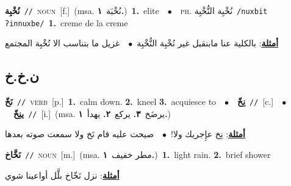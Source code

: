 \documentclass[10pt,a4paper,twoside]{article} %
\begin{document}
\begin{multicols}{2}
{\setlength\topsep{0pt}\textbf{\foreignlanguage{arabic}{نُخْبِة}}\ {\color{gray}\texttt{//}\color{black}}\ \textsc{noun}\ [f.]\ \color{gray}(msa. \foreignlanguage{arabic}{نُخْبَة}~\foreignlanguage{arabic}{\textbf{١.}})\color{black}\ \textbf{1.}~elite\ \ $\bullet$\ \ \textsc{ph.} \color{gray} \foreignlanguage{arabic}{نُخْبِة النُّخْبِة}\color{black}\ {\color{gray}\texttt{/{\sffamily nuxbit ʔinnuxbe}/}\color{black}}\ \textbf{1.}~creme de la creme\  \begin{flushright}\color{gray}\foreignlanguage{arabic}{\textbf{\underline{\foreignlanguage{arabic}{أمثلة}}}: بالكلية عنا مابنقبل غير نُخْبِة النُّخْبِة\ $\bullet$\ \  غزيل ما بتناسب الا نُخْبِة المجتمع}\end{flushright}\color{black}} \vspace{2mm}

\vspace{-3mm}
\subsection*{\color{blue}\foreignlanguage{arabic}{ن.خ.خ}\color{blue}{}} 

{\setlength\topsep{0pt}\textbf{\foreignlanguage{arabic}{نَخّ}}\ {\color{gray}\texttt{//}\color{black}}\ \textsc{verb}\ [p.]\ \textbf{1.}~calm down.  \textbf{2.}~kneel  \textbf{3.}~acquiesce to\ \ $\bullet$\ \ \setlength\topsep{0pt}\textbf{\foreignlanguage{arabic}{نِخّ}}\ {\color{gray}\texttt{//}\color{black}}\ [c.]\ \ $\bullet$\ \ \setlength\topsep{0pt}\textbf{\foreignlanguage{arabic}{ينِخّ}}\ {\color{gray}\texttt{//}\color{black}}\ [i.]\ \color{gray}(msa. \foreignlanguage{arabic}{يرضَخ}~\foreignlanguage{arabic}{\textbf{٣.}}  \foreignlanguage{arabic}{يركع}~\foreignlanguage{arabic}{\textbf{٢.}}  \foreignlanguage{arabic}{يهدأ}~\foreignlanguage{arabic}{\textbf{١.}})\color{black}\  \begin{flushright}\color{gray}\foreignlanguage{arabic}{\textbf{\underline{\foreignlanguage{arabic}{أمثلة}}}: نِخ عإِجريك ولا!\ $\bullet$\ \  صيحت عليه قام نَخ ولا سمعت صوته بعدها}\end{flushright}\color{black}} \vspace{2mm}

{\setlength\topsep{0pt}\textbf{\foreignlanguage{arabic}{نَخَّاخ}}\ {\color{gray}\texttt{//}\color{black}}\ \textsc{noun}\ [m.]\ \color{gray}(msa. \foreignlanguage{arabic}{مطر خفيف}~\foreignlanguage{arabic}{\textbf{١.}})\color{black}\ \textbf{1.}~light rain.  \textbf{2.}~brief shower\  \begin{flushright}\color{gray}\foreignlanguage{arabic}{\textbf{\underline{\foreignlanguage{arabic}{أمثلة}}}: نزل نَخّاخ بلَّل أواعينا شوي}\end{flushright}\color{black}} \vspace{2mm}


\end{multicols}
\end{document}
